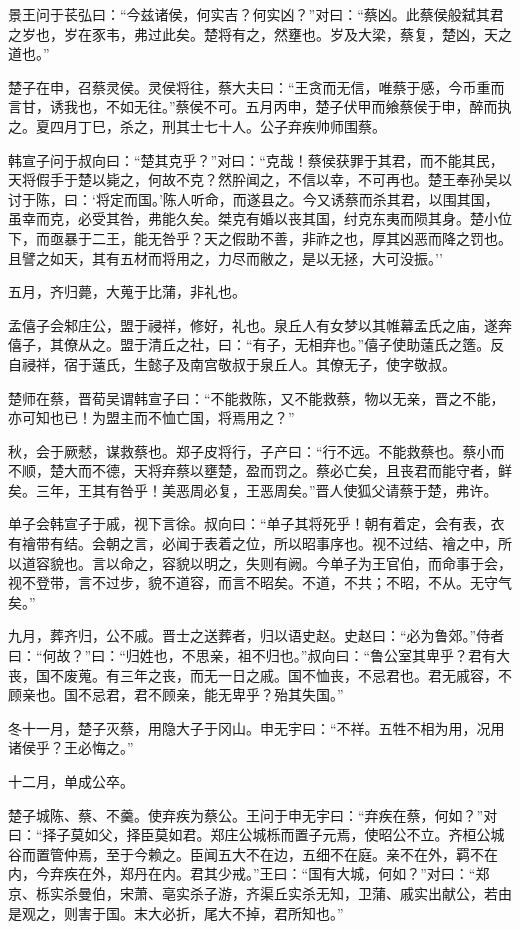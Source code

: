 \documentclass[]{article}
\begin{document}
景王问于苌弘曰：``今兹诸侯，何实吉？何实凶？''对曰：``蔡凶。此蔡侯般弑其君之岁也，岁在豕韦，弗过此矣。楚将有之，然壅也。岁及大梁，蔡复，楚凶，天之道也。''

楚子在申，召蔡灵侯。灵侯将往，蔡大夫曰：``王贪而无信，唯蔡于感，今币重而言甘，诱我也，不如无往。''蔡侯不可。五月丙申，楚子伏甲而飨蔡侯于申，醉而执之。夏四月丁巳，杀之，刑其士七十人。公子弃疾帅师围蔡。

韩宣子问于叔向曰：``楚其克乎？''对曰：``克哉！蔡侯获罪于其君，而不能其民，天将假手于楚以毙之，何故不克？然肸闻之，不信以幸，不可再也。楚王奉孙吴以讨于陈，曰：`将定而国。'陈人听命，而遂县之。今又诱蔡而杀其君，以围其国，虽幸而克，必受其咎，弗能久矣。桀克有婚以丧其国，纣克东夷而陨其身。楚小位下，而亟暴于二王，能无咎乎？天之假助不善，非祚之也，厚其凶恶而降之罚也。且譬之如天，其有五材而将用之，力尽而敝之，是以无拯，大可没振。''

五月，齐归薨，大蒐于比蒲，非礼也。

孟僖子会邾庄公，盟于祲祥，修好，礼也。泉丘人有女梦以其帷幕孟氏之庙，遂奔僖子，其僚从之。盟于清丘之社，曰：``有子，无相弃也。''僖子使助薳氏之簉。反自祲祥，宿于薳氏，生懿子及南宫敬叔于泉丘人。其僚无子，使字敬叔。

楚师在蔡，晋荀吴谓韩宣子曰：``不能救陈，又不能救蔡，物以无亲，晋之不能，亦可知也已！为盟主而不恤亡国，将焉用之？''

秋，会于厥憖，谋救蔡也。郑子皮将行，子产曰：``行不远。不能救蔡也。蔡小而不顺，楚大而不德，天将弃蔡以壅楚，盈而罚之。蔡必亡矣，且丧君而能守者，鲜矣。三年，王其有咎乎！美恶周必复，王恶周矣。''晋人使狐父请蔡于楚，弗许。

单子会韩宣子于戚，视下言徐。叔向曰：``单子其将死乎！朝有着定，会有表，衣有禬带有结。会朝之言，必闻于表着之位，所以昭事序也。视不过结、禬之中，所以道容貌也。言以命之，容貌以明之，失则有阙。今单子为王官伯，而命事于会，视不登带，言不过步，貌不道容，而言不昭矣。不道，不共；不昭，不从。无守气矣。''

九月，葬齐归，公不戚。晋士之送葬者，归以语史赵。史赵曰：``必为鲁郊。''侍者曰：``何故？''曰：``归姓也，不思亲，祖不归也。''叔向曰：``鲁公室其卑乎？君有大丧，国不废蒐。有三年之丧，而无一日之戚。国不恤丧，不忌君也。君无戚容，不顾亲也。国不忌君，君不顾亲，能无卑乎？殆其失国。''

冬十一月，楚子灭蔡，用隐大子于冈山。申无宇曰：``不祥。五牲不相为用，况用诸侯乎？王必悔之。''

十二月，单成公卒。

楚子城陈、蔡、不羹。使弃疾为蔡公。王问于申无宇曰：``弃疾在蔡，何如？''对曰：``择子莫如父，择臣莫如君。郑庄公城栎而置子元焉，使昭公不立。齐桓公城谷而置管仲焉，至于今赖之。臣闻五大不在边，五细不在庭。亲不在外，羁不在内，今弃疾在外，郑丹在内。君其少戒。''王曰：``国有大城，何如？''对曰：``郑京、栎实杀曼伯，宋萧、亳实杀子游，齐渠丘实杀无知，卫蒲、戚实出献公，若由是观之，则害于国。末大必折，尾大不掉，君所知也。''
\end{document}
